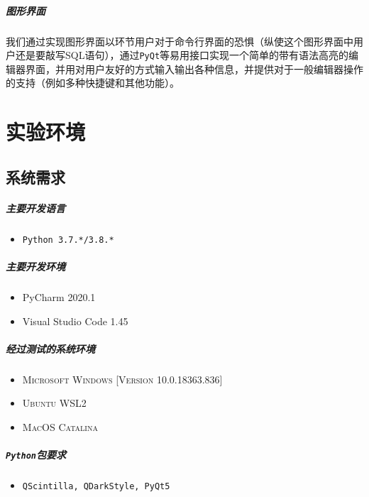 \documentclass[UTF8]{ctexrep} %
\begin{document}
\paragraph{图形界面}
我们通过实现图形界面以环节用户对于命令行界面的恐惧（纵使这个图形界面中用户还是要敲写SQL语句），通过\texttt{PyQt}等易用接口实现一个简单的带有语法高亮的编辑器界面，并用对用户友好的方式输入输出各种信息，并提供对于一般编辑器操作的支持（例如多种快捷键和其他功能）。

\chapter{实验环境}
\section{系统需求}
\paragraph{主要开发语言}
\begin{itemize}
    \item \texttt{Python 3.7.*/3.8.*}
\end{itemize}
\paragraph{主要开发环境}
\begin{itemize}
    \item PyCharm 2020.1
    \item Visual Studio Code 1.45
\end{itemize}
\paragraph{经过测试的系统环境}
\begin{itemize}
    \item \textsc{Microsoft Windows [Version 10.0.18363.836]}
    \item \textsc{Ubuntu WSL2}
    \item \textsc{MacOS Catalina}
\end{itemize}
\paragraph{\texttt{Python}包要求}
\begin{itemize}
    \item \texttt{QScintilla, QDarkStyle, PyQt5}
\end{itemize}
\end{document}
